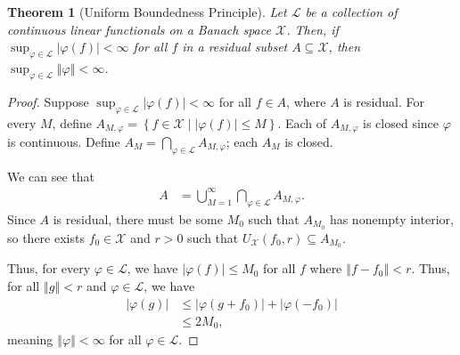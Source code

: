 \documentclass[10pt]{extarticle}
\newcommand{\norm}[1]{\left\Vert #1\right\Vert}
\newcommand{\set}[1]{\left\{#1\right\}}
\theoremstyle{plain}
\newtheorem*{theorem}{Theorem}
\theoremstyle{definition}
\theoremstyle{note}
\renewcommand{\newline}{\hfill\break}
\begin{document}
\begin{theorem}[Uniform Boundedness Principle]
  Let $\mathcal{L}$ be a collection of continuous linear functionals on a Banach space $\mathcal{X}$. Then, if $\sup_{\varphi \in \mathcal{L}}\left\vert \varphi(f) \right\vert < \infty$ for all $f$ in a residual subset $A\subseteq \mathcal{X}$, then $\sup_{\varphi \in \mathcal{L}}\norm{\varphi} < \infty$.
\end{theorem}
\begin{proof}
  Suppose $\sup_{\varphi \in \mathcal{L}}\left\vert \varphi(f) \right\vert < \infty$ for all $f\in A$, where $A$ is residual. For every $M$, define $A_{M,\varphi} = \set{f\in \mathcal{X}\mid \left\vert \varphi(f) \right\vert\leq M}$. Each of $A_{M,\varphi}$ is closed since $\varphi$ is continuous. Define $A_{M} = \bigcap_{\varphi \in \mathcal{L}}A_{M,\varphi}$; each $A_{M}$ is closed.\newline

  We can see that
  \begin{align*}
    A &= \bigcup_{M=1}^{\infty}\bigcap_{\varphi \in \mathcal{L}}A_{M,\varphi}.
  \end{align*}
  Since $A$ is residual, there must be some $M_0$ such that $A_{M_0}$ has nonempty interior, so there exists $f_0\in \mathcal{X}$ and $r > 0$ such that $U_{\mathcal{X}}\left(f_0,r\right)\subseteq A_{M_0}$.\newline

  Thus, for every $\varphi \in \mathcal{L}$, we have $\left\vert \varphi(f) \right\vert \leq M_0$ for all $f$ where $\norm{f-f_0} < r$. Thus, for all $\norm{g} < r$ and $\varphi \in \mathcal{L}$, we have
  \begin{align*}
    \left\vert \varphi(g) \right\vert &\leq \left\vert \varphi(g + f_0) \right\vert + \left\vert \varphi(-f_0) \right\vert\\
                                      &\leq 2M_0,
  \end{align*}
  meaning $\norm{\varphi} < \infty$ for all $\varphi \in \mathcal{L}$.
\end{proof}
\end{document}
